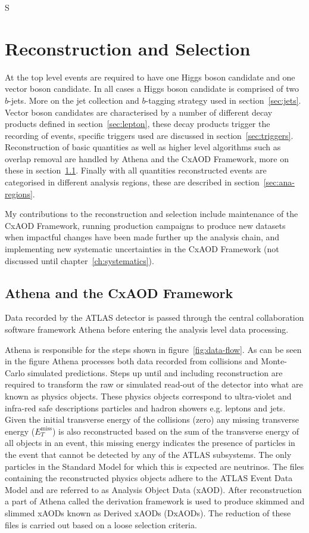 S\chapter{Reconstruction and Selection}%
\label{ch:recon}

At the top level events are required to have one Higgs boson candidate and one
vector boson candidate. In all cases a Higgs boson candidate is comprised of two
$b$-jets. More on the jet collection and $b$-tagging strategy used in
section~\ref{sec:jets}. Vector boson candidates are characterised by a number of
different decay products defined in section~\ref{sec:lepton}, these decay
products trigger the recording of events, specific triggers used are discussed
in section~\ref{sec:triggers}. Reconstruction of basic quantities as well as
higher level algorithms such as overlap removal are handled by Athena and the
CxAOD Framework, more on these in section~\ref{sec:cxaod}. Finally with all
quantities reconstructed events are categorised in different analysis regions,
these are described in section~\ref{sec:ana-regions}.

My contributions to the reconstruction and selection include maintenance of the
CxAOD Framework, running production campaigns to produce new datasets when
impactful changes have been made further up the analysis chain, and implementing
new systematic uncertainties in the CxAOD Framework (not discussed until
chapter~\ref{ch:systematics}).

\section{Athena and the CxAOD Framework}
\label{sec:cxaod}
Data recorded by the ATLAS detector is passed through the central collaboration
software framework Athena before entering the analysis level data processing.

Athena is responsible for the steps shown in figure~\ref{fig:data-flow}. As can
be seen in the figure Athena processes both data recorded from collisions and
Monte-Carlo simulated predictions. Steps up until and including reconstruction
are required to transform the raw or simulated read-out of the detector into
what are known as physics objects. These physics objects correspond to
ultra-violet and infra-red safe descriptions particles and hadron showers e.g.
leptons and jets. Given the initial transverse energy of the collisions (zero)
any missing transverse energy ($E_T^{\text{miss}}$) is also reconstructed based
on the sum of the transverse energy of all objects in an event, this missing
energy indicates the presence of particles in the event that cannot be detected
by any of the ATLAS subsystems. The only particles in the Standard Model for
which this is expected are neutrinos. The files containing the reconstructed
physics objects adhere to the ATLAS Event Data Model and are referred to as
Analysis Object Data (xAOD). After reconstruction a part of Athena called the
derivation framework is used to produce skimmed and slimmed xAODs known as
Derived xAODs (DxAODs). The reduction of these files is carried out based on a
loose selection criteria.

